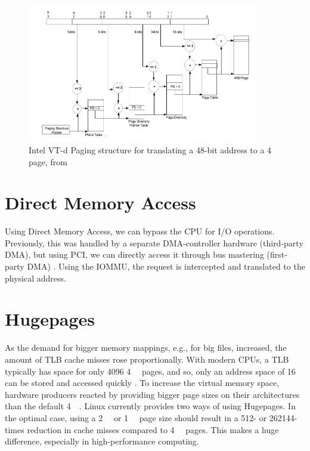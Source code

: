 \begin{figure}[H]
    \centering
    \includegraphics[width=0.9\textwidth]{figures/4kibtranslation.pdf}
    \caption{Intel VT-d Paging structure for translating a 48-bit address to a \qty{4}{\kibi\byte} page, from \cite{vtdspec}}
    \label{fig:pagewalk}
\end{figure}

\section{Direct Memory Access}
Using Direct Memory Access, we can bypass the CPU for I/O operations. Previously, this was handled by a separate DMA-controller hardware (third-party DMA), but using PCI, we can directly access it through bus mastering (first-party DMA) \cite{maellmann}. Using the IOMMU, the request is intercepted and translated to the physical address.

\section{Hugepages}
As the demand for bigger memory mappings, e.g., for big files, increased, the amount of TLB cache misses rose proportionally. With modern CPUs, a TLB typically has space for only 4096 \qty{4}{\kibi\byte} pages, and so, only an address space of \qty{16}{\mebi\byte} can be stored and accessed quickly \cite{emmerich2019user}. To increase the virtual memory space, hardware producers reacted by providing bigger page sizes on their architectures than the default \qty{4}{\kibi\byte}.
Linux currently provides two ways of using Hugepages.
In the optimal case, using a \qty{2}{\mebi\byte} or \qty{1}{\gibi\byte} page size should result in a 512- or 262144-times reduction in cache misses compared to \qty{4}{\kibi\byte} pages. This makes a huge difference, especially in high-performance computing.

